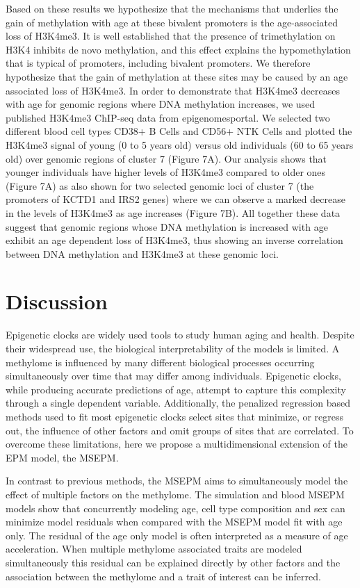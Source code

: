 \documentclass[sn-nature]{sn-jnl}
\begin{document}
{\begin{linenumbers}
Based on these results we hypothesize that the mechanisms that underlies the gain of methylation with age at these 
bivalent promoters is the age-associated loss of H3K4me3.  It is well established that the presence of trimethylation
 on H3K4 inhibits de novo methylation, and this effect explains the hypomethylation that is typical of promoters, 
 including bivalent promoters.  We therefore hypothesize that the gain of methylation at these sites may be caused 
 by an age associated loss of H3K4me3.  In order to demonstrate that H3K4me3 decreases with age for genomic regions 
 where DNA methylation increases, we used published H3K4me3 ChIP-seq data from epigenomesportal\cite{Bujold2016-vk}. 
 We selected two different blood cell types CD38+ B Cells and CD56+ NTK Cells and plotted the H3K4me3 signal of young 
 (0 to 5 years old) versus old individuals (60 to 65 years old) over genomic regions of cluster 7 (Figure 7A). 
 Our analysis shows that younger individuals have higher levels of H3K4me3 compared to older ones (Figure 7A) as 
 also shown for two selected genomic loci of cluster 7 (the promoters of KCTD1 and IRS2 genes) where we can observe
 a marked decrease in the levels of H3K4me3 as age increases (Figure 7B). All together these data suggest that genomic 
 regions whose DNA methylation is increased with age exhibit an age dependent loss of H3K4me3, thus showing an inverse 
 correlation between DNA methylation and H3K4me3 at these genomic loci. 

\section{Discussion}\label{sec4}

Epigenetic clocks are widely used tools to study human aging and health. Despite their widespread use, 
the biological interpretability of the models is limited. A methylome is influenced by many different biological 
processes occurring simultaneously over time that may differ among individuals. Epigenetic clocks, while producing
 accurate predictions of age, attempt to capture this complexity through a single dependent variable. Additionally,
  the penalized regression based methods used to fit most epigenetic clocks select sites that minimize, or regress out,
   the influence of other factors and omit groups of sites that are correlated. To overcome these limitations, here 
   we propose a multidimensional extension of the EPM model, the MSEPM. 

In contrast to previous methods, the MSEPM aims to simultaneously model the effect of multiple factors on the methylome.
The simulation and blood MSEPM models show that concurrently modeling age, cell type composition and sex can minimize  
model residuals when compared with the MSEPM model fit with age only. The residual of the age only model is often 
interpreted as a measure of age acceleration. When multiple methylome associated traits are modeled simultaneously 
this residual can be explained directly by other factors and the association between the methylome and a trait of 
interest can be inferred. 


\end{linenumbers}}
\end{document}
